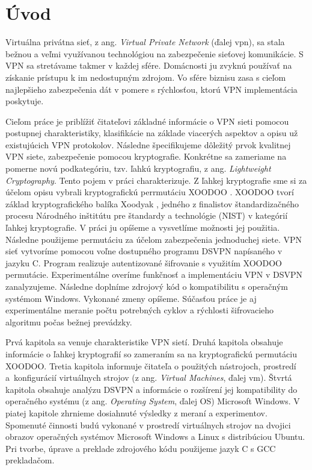 
{}

\chapter*{Úvod}
Virtuálna privátna sieť, z ang. \textit{Virtual Private Network} (ďalej \acrshort{vpn}), sa stala bežnou a veľmi využívanou technológiou na zabezpečenie sieťovej komunikácie. S VPN sa stretávame takmer v každej sfére. Domácnosti ju zvyknú používať na získanie prístupu k im nedostupným zdrojom. Vo sfére biznisu zasa s cieľom najlepšieho zabezpečenia dát v pomere s rýchlosťou, ktorú VPN implementácia poskytuje. 

Cieľom práce je priblížiť čitateľovi základné informácie o VPN sieti pomocou postupnej charakteristiky, klasifikácie na základe viacerých aspektov a opisu už existujúcich VPN protokolov. Následne špecifikujeme dôležitý prvok kvalitnej VPN siete, zabezpečenie pomocou kryptografie. Konkrétne sa zameriame na pomerne novú podkategóriu, tzv. ľahkú kryptografiu, z ang. \textit{Lightweight Cryptography}. Tento pojem v práci charakterizuje. Z ľahkej kryptografie sme si za účelom opisu vybrali kryptografickú perrmutáciu XOODOO \cite{xcb}. XOODOO tvorí základ kryptografického balíka Xoodyak \cite{tkecak}, jedného z finalistov štandardizačného procesu Národného inštitútu pre štandardy a technológie (NIST) v kategórií ľahkej kryptografie. V práci ju opíšeme a vysvetlíme možnosti jej použitia. Následne použijeme permutáciu za účelom zabezpečenia jednoduchej siete. VPN sieť vytvoríme pomocou voľne dostupného programu DSVPN napísaného v jazyku C. Program realizuje autentizované šifrovanie s využitím XOODOO permutácie. Experimentálne overíme funkčnosť a implementáciu VPN v DSVPN zanalyzujeme. Následne doplníme zdrojový kód o kompatibilitu s operačným systémom Windows. Vykonané zmeny opíšeme. Súčasťou práce je aj experimentálne meranie počtu potrebných cyklov a rýchlosti šifrovacieho algoritmu počas bežnej prevádzky. 

Prvá kapitola sa venuje charakteristike VPN sietí. Druhá kapitola obsahuje informácie o ľahkej kryptografií so zameraním sa na kryptografickú permutáciu XOODOO. Tretia kapitola informuje čitateľa o použitých nástrojoch, prostredí a~konfigurácií virtuálnych strojov (z ang. \textit{Virtual Machines}, ďalej \acrshort{vm}). Štvrtá kapitola obsahuje analýzu DSVPN a informácie o rozšírení jej kompatibility do operačného systému (z ang. \textit{Operating System}, ďalej OS) Microsoft Windows. V piatej kapitole zhrnieme dosiahnuté výsledky z meraní a experimentov. Spomenuté činnosti budú vykonané v prostredí virtuálnych strojov na dvojici obrazov operačných systémov Microsoft Windows a Linux s distribúciou Ubuntu. Pri tvorbe, úprave a preklade zdrojového kódu použijeme jazyk C s GCC prekladačom. 



